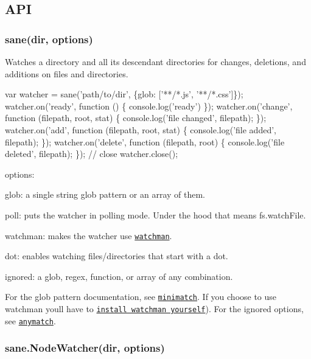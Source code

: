 \subsection*{A\+PI}

\subsubsection*{sane(dir, options)}

Watches a directory and all it\textquotesingle{}s descendant directories for changes, deletions, and additions on files and directories.


\begin{DoxyCode}
var watcher = sane('path/to/dir', \{glob: ['**/*.js', '**/*.css']\});
watcher.on('ready', function () \{ console.log('ready') \});
watcher.on('change', function (filepath, root, stat) \{ console.log('file changed', filepath); \});
watcher.on('add', function (filepath, root, stat) \{ console.log('file added', filepath); \});
watcher.on('delete', function (filepath, root) \{ console.log('file deleted', filepath); \});
// close
watcher.close();
\end{DoxyCode}


options\+:


\begin{DoxyItemize}
\item {\ttfamily glob}\+: a single string glob pattern or an array of them.
\item {\ttfamily poll}\+: puts the watcher in polling mode. Under the hood that means {\ttfamily fs.\+watch\+File}.
\item {\ttfamily watchman}\+: makes the watcher use \href{https://facebook.github.io/watchman/}{\tt watchman}.
\item {\ttfamily dot}\+: enables watching files/directories that start with a dot.
\item {\ttfamily ignored}\+: a glob, regex, function, or array of any combination.
\end{DoxyItemize}

For the glob pattern documentation, see \href{https://github.com/isaacs/minimatch}{\tt minimatch}. If you choose to use {\ttfamily watchman} you\textquotesingle{}ll have to \href{https://facebook.github.io/watchman/docs/install.html}{\tt install watchman yourself}). For the ignored options, see \href{https://github.com/es128/anymatch}{\tt anymatch}.

\subsubsection*{sane.\+Node\+Watcher(dir, options)}

